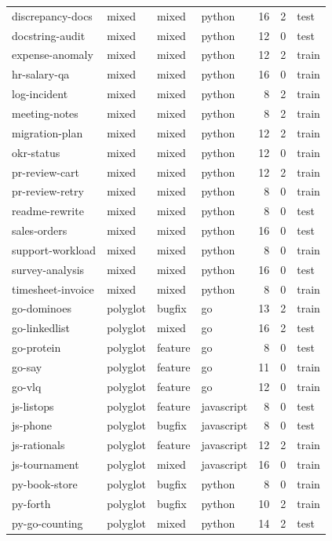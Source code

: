 \documentclass[11pt,letterpaper]{article}
\begin{document}
{\begin{xltabular}{\textwidth}{@{}l l l l r r l@{}}
discrepancy-docs & mixed & mixed & python & 16 & 2 & test \\
docstring-audit & mixed & mixed & python & 12 & 0 & test \\
expense-anomaly & mixed & mixed & python & 12 & 2 & train \\
hr-salary-qa & mixed & mixed & python & 16 & 0 & train \\
log-incident & mixed & mixed & python & 8 & 2 & train \\
meeting-notes & mixed & mixed & python & 8 & 2 & train \\
migration-plan & mixed & mixed & python & 12 & 2 & train \\
okr-status & mixed & mixed & python & 12 & 0 & train \\
pr-review-cart & mixed & mixed & python & 12 & 2 & train \\
pr-review-retry & mixed & mixed & python & 8 & 0 & train \\
readme-rewrite & mixed & mixed & python & 8 & 0 & test \\
sales-orders & mixed & mixed & python & 16 & 0 & test \\
support-workload & mixed & mixed & python & 8 & 0 & train \\
survey-analysis & mixed & mixed & python & 16 & 0 & test \\
timesheet-invoice & mixed & mixed & python & 8 & 0 & train \\
go-dominoes & polyglot & bugfix & go & 13 & 2 & train \\
go-linkedlist & polyglot & mixed & go & 16 & 2 & test \\
go-protein & polyglot & feature & go & 8 & 0 & test \\
go-say & polyglot & feature & go & 11 & 0 & train \\
go-vlq & polyglot & feature & go & 12 & 0 & train \\
js-listops & polyglot & feature & javascript & 8 & 0 & test \\
js-phone & polyglot & bugfix & javascript & 8 & 0 & test \\
js-rationals & polyglot & feature & javascript & 12 & 2 & train \\
js-tournament & polyglot & mixed & javascript & 16 & 0 & train \\
py-book-store & polyglot & bugfix & python & 8 & 0 & train \\
py-forth & polyglot & bugfix & python & 10 & 2 & train \\
py-go-counting & polyglot & mixed & python & 14 & 2 & test \\

\end{xltabular}}
\end{document}
